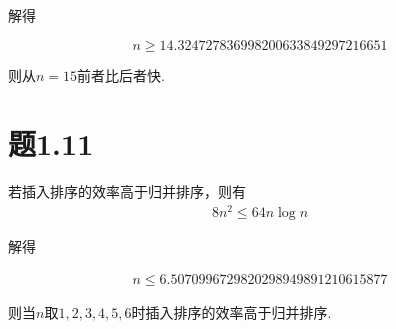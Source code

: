 \documentclass[a4paper,twoside]{article}
\begin{document}
\begin{spacing}{1.2}
解得

$$
n \ge 14.324727836998200633849297216651
$$

则从$n=15$前者比后者快.

\section{题1.11}
若插入排序的效率高于归并排序，则有
\begin{align*}
	8n^2 \le 64n \log n
\end{align*}

解得

\begin{align*}
	n \le 6.5070996729820298949891210615877
\end{align*}

则当$n$取$1,2,3,4,5,6$时插入排序的效率高于归并排序.

\end{spacing}
\end{document}
